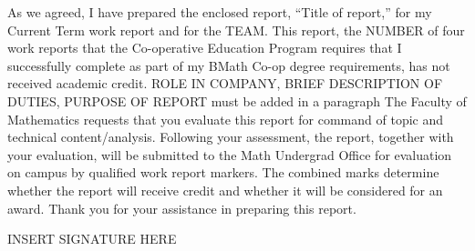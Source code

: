 \documentclass[12pt]{article}
\newcommand{\term}{Current Term } %
\newcommand{\WTT}{Title of report}
\begin{document}




\FirstPage

\newpage




\LetterHead



As we agreed, I have prepared the enclosed report, “\WTT,” for
my \term work report and for the TEAM. This
report, the NUMBER of four work reports that the Co-operative Education Program
requires that I successfully complete as part of my BMath Co-op degree
requirements, has not received academic credit.
\vskip 10pt
ROLE IN COMPANY, BRIEF DESCRIPTION OF DUTIES, PURPOSE OF REPORT must be added in a paragraph
\vskip 10pt 
The Faculty of Mathematics requests that you evaluate this report for command
of topic and technical content/analysis. Following your assessment, the report,
together with your evaluation, will be submitted to the Math Undergrad Office
for evaluation on campus by qualified work report markers. The combined
marks determine whether the report will receive credit and whether it will be
considered for an award.
Thank you for your assistance in preparing this report.

INSERT SIGNATURE HERE





\toc 







\end{document}
